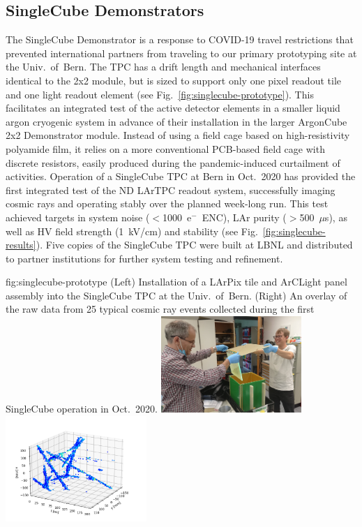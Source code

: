 \subsection{SingleCube Demonstrators}
\label{sec:singlecube-proto}

The SingleCube Demonstrator is a response to COVID-19 travel restrictions that prevented international partners from traveling to our primary prototyping site at the Univ.~of~Bern\@.
The TPC has a drift length and mechanical interfaces identical to the 2x2 module, but is sized to support only one pixel readout tile and one light readout element (see Fig.~\ref{fig:singlecube-prototype}). 
This facilitates an integrated test of the active detector elements in a smaller liquid argon cryogenic system in advance of their installation in the larger ArgonCube 2x2 Demonstrator module.
Instead of using a field cage based on high-resistivity polyamide film, it relies on a more conventional PCB-based field cage with discrete resistors, easily produced during the pandemic-induced curtailment of activities.
Operation of a SingleCube TPC at Bern in Oct.~2020 has provided the first integrated test of the ND LArTPC readout system, successfully imaging cosmic rays and operating stably over the planned week-long run.
This test achieved targets in system noise ($<$1000~e$^-$~ENC), LAr purity ($>$500~$\mu$s), as well as HV field strength (1~kV/cm) and stability (see Fig.~\ref{fig:singlecube-results}).
Five copies of the SingleCube TPC were built at LBNL and distributed to partner institutions for further system testing and refinement.

\begin{dunefigure}{fig:singlecube-prototype}
{(Left) Installation of a LArPix tile and ArCLight panel assembly into the SingleCube TPC at the Univ.~of~Bern.  (Right) An overlay of the raw data from 25 typical cosmic ray events collected during the first SingleCube operation in Oct.~2020\@.}
\includegraphics[width=0.4\textwidth]{graphics/lartpc/Prototyping/SingleCubeAssyAtBern.png}
\includegraphics[width=0.4\textwidth]{graphics/lartpc/Prototyping/singlecube_25evt_overlay.png}
\end{dunefigure}

